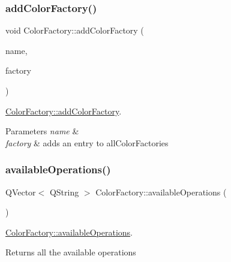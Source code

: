 \subsubsection{\texorpdfstring{add\+Color\+Factory()}{addColorFactory()}}
{\footnotesize\ttfamily void Color\+Factory\+::add\+Color\+Factory (\begin{DoxyParamCaption}\item[{const Q\+String \&}]{name,  }\item[{\hyperlink{class_generic_factory}{Generic\+Factory} \&}]{factory }\end{DoxyParamCaption})\hspace{0.3cm}{\ttfamily [static]}}



\hyperlink{class_color_factory_a16fd150054d514e72eaf6d5bf9e80fe2}{Color\+Factory\+::add\+Color\+Factory}. 


\begin{DoxyParams}{Parameters}
{\em name} & \\
\hline
{\em factory} & adds an entry to all\+Color\+Factories \\
\hline
\end{DoxyParams}
\mbox{\label{class_color_factory_a9dc30325232e3cf63276ed8f9c2d6ab1}} 
\subsubsection{\texorpdfstring{available\+Operations()}{availableOperations()}}
{\footnotesize\ttfamily Q\+Vector$<$ Q\+String $>$ Color\+Factory\+::available\+Operations (\begin{DoxyParamCaption}{ }\end{DoxyParamCaption})\hspace{0.3cm}{\ttfamily [static]}}



\hyperlink{class_color_factory_a9dc30325232e3cf63276ed8f9c2d6ab1}{Color\+Factory\+::available\+Operations}. 

\begin{DoxyReturn}{Returns}
all the available operations 
\end{DoxyReturn}
\mbox{\label{class_color_factory_a2c20174b2a883ee984ddb21d4cb31b5f}} 
